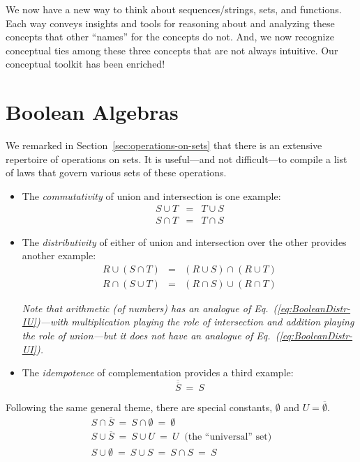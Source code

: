 \medskip

We now have a new way to think about sequences/strings, sets, and functions.  Each way conveys insights and tools for reasoning about and analyzing these concepts that other ``names'' for the concepts do not.  And, we now recognize conceptual ties among these three concepts that are not always intuitive.  Our conceptual toolkit has been enriched!

\section{Boolean Algebras}
\label{sec:Boolean-Algebra}

We remarked in Section~\ref{sec:operations-on-sets} that there is an extensive repertoire of operations on sets.  It is useful---and not difficult---to compile a list of laws that govern various sets of these operations.
\begin{itemize}
\item
The {\em commutativity} of union and intersection is one example:
\begin{eqnarray*}
S \cup T & = & T \cup S \\
S \cap T & = & T \cap S
\end{eqnarray*}

\medskip\item
The {\em distributivity} of either of union and intersection over the other provides another example:
\begin{eqnarray}
\label{eq:BooleanDistr-UI}
R \cup (S \cap T) & = & (R \cup S) \cap (R \cup T) \\
\label{eq:BooleanDistr-IU}
R \cap (S \cup T) & = & (R \cap S) \cup (R \cap T)
\end{eqnarray}

\smallskip

{\em Note that arithmetic (of numbers) has an analogue of Eq.~(\ref{eq:BooleanDistr-IU})---with multiplication playing the role of intersection and addition playing the role of union---but it does {\em not} have an analogue of Eq.~(\ref{eq:BooleanDistr-UI}).}

\medskip\item
The {\em idempotence} of complementation provides a third example:
\[ \overline{\overline{S}} \ = \ S \]
\end{itemize}
Following the same general theme, there are special constants, $\emptyset$ and $U = \overline{\emptyset}$.
\[
\begin{array}{l}
S \cap \overline{S} \ = \ S \cap \emptyset \ = \ \emptyset \\
S \cup \overline{S} \ = \ S \cup U \ = \ U \ \mbox{ (the ``universal'' set)} \\
S \cup \emptyset \ = \ S \cup S \ = \ S \cap S \ = \ S \\
\end{array}
\]

